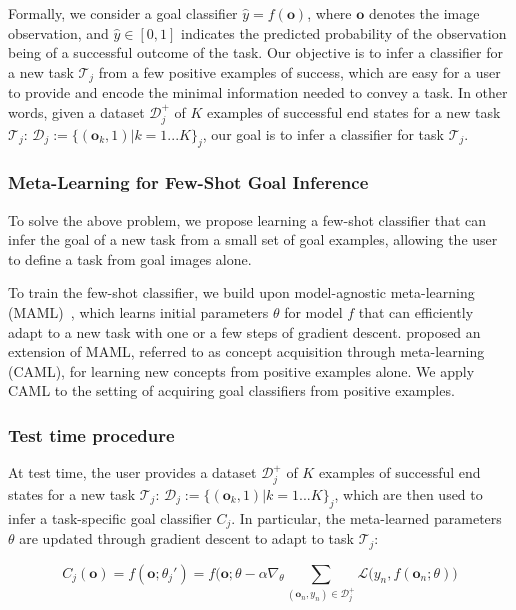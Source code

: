 \newcommand{\task}{\mathcal{T}}
\newcommand{\data}{\mathcal{D}}
\newcommand{\obs}{\mathbf{o}}
\newcommand{\out}{y}
\newcommand{\posdata}{\data^+}
\newcommand{\testdata}{\data^\text{test}}
\newcommand{\loss}{\mathcal{L}}

Formally, we consider a goal classifier $\hat{\out} = f(\obs)$, where $\obs$ denotes the image observation, and $\hat{\out} \in [0,1]$ indicates the predicted probability of the observation being of a successful outcome of the task. Our objective is to infer a classifier for a new task $\task_j$ from a few positive examples of success, which are easy for a user to provide and encode the minimal information needed to convey a task. In other words, given a dataset $\posdata_j$ of $K$ examples of successful end states for a new task $\task_j$: $\data_j:=\{(\obs_k, 1) | k = 1...K\}_j$, our goal is to infer a classifier for task $\task_j$.

\subsubsection{Meta-Learning for Few-Shot Goal Inference}

To solve the above problem, we propose learning a few-shot classifier that can infer the goal of a new task from a small set of goal examples, allowing the user to define a task from goal images alone.

To train the few-shot classifier, we build upon model-agnostic meta-learning (MAML)~\cite{maml}, which learns initial parameters $\theta$ for model $f$ that can efficiently adapt to a new task with one or a few steps of gradient descent. \citet{caml} proposed an extension of MAML, referred to as concept acquisition through meta-learning (CAML), for learning new concepts from positive examples alone. We apply CAML to the setting of acquiring goal classifiers from positive examples.

\subsubsection{Test time procedure}
At test time, the user provides a dataset $\posdata_j$ of $K$ examples of successful end states for a new task $\task_j$: $\data_j:=\{(\obs_k, 1) | k = 1...K\}_j$, which are then used to infer a task-specific goal classifier $C_j$. In particular, the meta-learned parameters $\theta$ are updated through gradient descent to adapt to task $\task_j$:

$$
C_j(\obs)
= f(\obs; \theta_j')
= f\big(\obs; \theta-\alpha \nabla_\theta \!\!\! \sum_{(\obs_n, \out_n)\in \posdata_j} \loss (\out_n, f(\obs_n; \theta)\big)
$$

